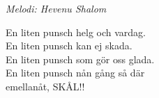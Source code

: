 {\footnotesize\textit{Melodi: Hevenu Shalom}}\par
\vspace{10pt}
En liten punsch helg och vardag.\\
En liten punsch kan ej skada.\\
En liten punsch som gör oss glada.\\
En liten punsch nån gång så där\\
emellanåt, SKÅL!!
